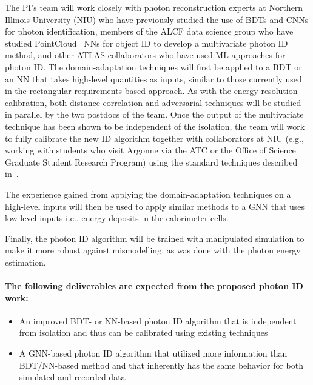 \documentclass[letter, USenglish, 11pt, subfigure]{article}
\begin{document}
The PI's team will work closely with photon reconstruction experts at Northern Illinois University (NIU) who have previously studied the use of BDTs and CNNs for photon identification, members of the ALCF data science group who have studied PointCloud~\cite{ATL-PHYS-PUB-2021-002} NNs for object ID to develop a multivariate photon ID method, and other ATLAS collaborators who have used ML approaches for photon ID. The domain-adaptation techniques will first be applied to a BDT or an NN that takes high-level quantities as inputs, similar to those currently used in the rectangular-requirements-based approach. As with the energy resolution calibration, both distance correlation and adversarial techniques will be studied in parallel by the two postdocs of the team. Once the output of the multivariate technique has been shown to be independent of the isolation, the team will work to fully calibrate the new ID algorithm together with collaborators at NIU (e.g., working with students who visit Argonne via the ATC or the Office of Science Graduate Student Research Program) using the standard techniques described in~\cite{PERF-2013-04,PERF-2017-02}.

The experience gained from applying the domain-adaptation techniques on a high-level inputs will then be used to apply similar methods to a GNN that uses low-level inputs i.e., energy deposits in the calorimeter cells.

Finally, the photon ID algorithm will be trained with manipulated simulation to make it more robust against mismodelling, as was done with the photon energy estimation. 

\paragraph{The following deliverables are expected from the proposed photon ID work:}
\begin{itemize}
\item An improved BDT- or NN-based photon ID algorithm that is independent from isolation and thus can be calibrated using existing techniques
\item A GNN-based photon ID algorithm that utilized more information than BDT/NN-based method and that inherently has the same behavior for both simulated and recorded data
\end{itemize}
\end{document}
